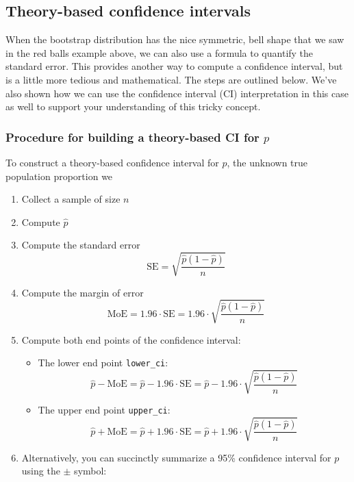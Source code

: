 \documentclass[12pt,]{krantz}
\providecommand{\tightlist}{%
  \setlength{\itemsep}{0pt}\setlength{\parskip}{0pt}}
\theoremstyle{definition}
\theoremstyle{definition}
\theoremstyle{definition}
\theoremstyle{remark}
\begin{document}
\subsection{Theory-based confidence
intervals}\label{theory-based-confidence-intervals}

When the bootstrap distribution has the nice symmetric, bell shape that
we saw in the red balls example above, we can also use a formula to
quantify the standard error. This provides another way to compute a
confidence interval, but is a little more tedious and mathematical. The
steps are outlined below. We've also shown how we can use the confidence
interval (CI) interpretation in this case as well to support your
understanding of this tricky concept.

\subsubsection*{\texorpdfstring{Procedure for building a theory-based CI
for
\(p\)}{Procedure for building a theory-based CI for p}}\label{procedure-for-building-a-theory-based-ci-for-p}

To construct a theory-based confidence interval for \(p\), the unknown
true population proportion we

\begin{enumerate}
\def\labelenumi{\arabic{enumi}.}
\tightlist
\item
  Collect a sample of size \(n\)
\item
  Compute \(\widehat{p}\)
\item
  Compute the standard error
  \[\text{SE} = \sqrt{\frac{\widehat{p}(1-\widehat{p})}{n}}\]
\item
  Compute the margin of error
  \[\text{MoE} = 1.96 \cdot \text{SE} =  1.96 \cdot \sqrt{\frac{\widehat{p}(1-\widehat{p})}{n}}\]
\item
  Compute both end points of the confidence interval:

  \begin{itemize}
  \tightlist
  \item
    The lower end point \texttt{lower\_ci}:
    \[\widehat{p} - \text{MoE} = \widehat{p} - 1.96 \cdot \text{SE} = \widehat{p} - 1.96 \cdot \sqrt{\frac{\widehat{p}(1-\widehat{p})}{n}}\]
  \item
    The upper end point \texttt{upper\_ci}:
    \[\widehat{p} + \text{MoE} = \widehat{p} + 1.96 \cdot \text{SE} = \widehat{p} + 1.96 \cdot \sqrt{\frac{\widehat{p}(1-\widehat{p})}{n}}\]
  \end{itemize}
\item
  Alternatively, you can succinctly summarize a 95\% confidence interval
  for \(p\) using the \(\pm\) symbol:
\end{enumerate}
\end{document}

